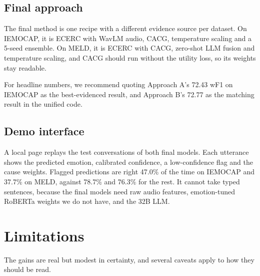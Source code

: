 \documentclass[11pt,a4paper]{article}
\begin{document}
\subsection{Final approach}

The final method is one recipe with a different evidence source per dataset. On IEMOCAP, it is ECERC with WavLM audio, CACG, temperature scaling and a 5-seed ensemble. On MELD, it is ECERC with CACG, zero-shot LLM fusion and temperature scaling, and CACG should run without the utility loss, so its weights stay readable.

For headline numbers, we recommend quoting Approach A's 72.43 wF1 on IEMOCAP as the best-evidenced result, and Approach B's 72.77 as the matching result in the unified code.

\subsection{Demo interface}

A local page replays the test conversations of both final models. Each utterance shows the predicted emotion, calibrated confidence, a low-confidence flag and the cause weights. Flagged predictions are right 47.0\% of the time on IEMOCAP and 37.7\% on MELD, against 78.7\% and 76.3\% for the rest. It cannot take typed sentences, because the final models need raw audio features, emotion-tuned RoBERTa weights we do not have, and the 32B LLM.

\section{Limitations}
\label{sec:limitations}

The gains are real but modest in certainty, and several caveats apply to how they should be read.
\end{document}
